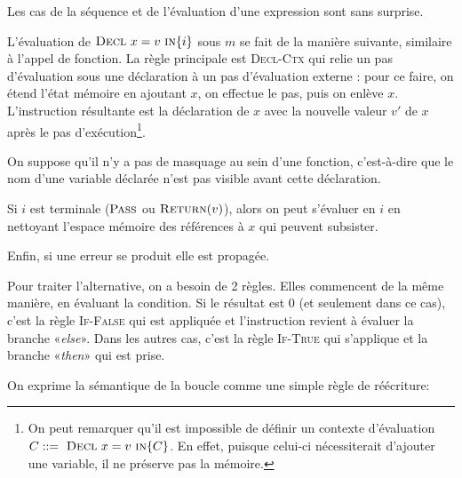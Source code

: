 Les cas de la séquence et de l'évaluation d'une expression sont sans surprise.

\begin{mathpar}

\end{mathpar}

L'évaluation de $\iDecl{x}{v}{i}$ sous $m$ se fait de la manière suivante,
similaire à l'appel de fonction.
La règle principale est \textsc{Decl-Ctx} qui relie un pas d'évaluation sous une
déclaration à un pas d'évaluation externe : pour ce faire, on étend l'état
mémoire en ajoutant $x$, on effectue le pas, puis on enlève $x$. L'instruction
résultante est la déclaration de $x$ avec la nouvelle valeur $v'$ de $x$ après
le pas d'exécution\footnote{
    On peut remarquer qu'il est impossible de définir un contexte d'évaluation
    $C \gramisa \iDecl{x}{v}{C}$. En effet, puisque celui-ci nécessiterait
    d'ajouter une variable, il ne préserve pas la mémoire.
}.

\label{page:decl-masquage}
On suppose qu'il n'y a pas de masquage au sein d'une fonction, c'est-à-dire que
le nom d'une variable déclarée n'est pas visible avant cette déclaration.

Si $i$ est terminale ($\iPass$ ou $\iReturn{v}$), alors on peut s'évaluer en $i$
en nettoyant l'espace mémoire des références à $x$ qui peuvent subsister.

Enfin, si une erreur se produit elle est propagée.

\begin{mathpar}



\end{mathpar}

Pour traiter l'alternative, on a besoin de 2 règles. Elles commencent de la même
manière, en évaluant la condition. Si le résultat est 0 (et seulement dans ce
cas), c'est la règle \textsc{If-False} qui est appliquée et l'instruction
revient à évaluer la branche «\emph{else}». Dans les autres cas, c'est la règle
\textsc{If-True} qui s'applique et la branche «\emph{then}» qui est prise.

\begin{mathpar}

\end{mathpar}

On exprime la sémantique de la boucle comme une simple règle de réécriture:

